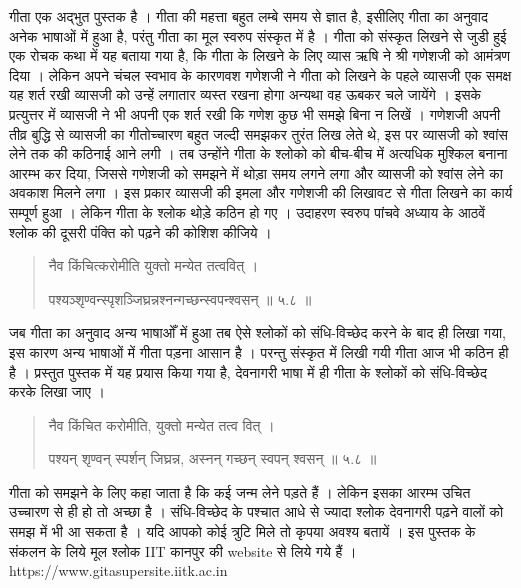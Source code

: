 गीता एक अद्भुत पुस्तक है ।  गीता की महत्ता बहुत लम्बे समय से ज्ञात है, इसीलिए गीता का अनुवाद अनेक भाषाओं में हुआ है, परंतु गीता का मूल स्वरुप संस्कृत में है ।  गीता को संस्कृत लिखने से जुडी हुई एक रोचक कथा में यह बताया गया है, कि गीता के लिखने के लिए व्यास ऋषि ने श्री गणेशजी को आमंत्रण दिया ।  लेकिन अपने चंचल स्वभाव के कारणवश गणेशजी ने गीता को लिखने के पहले व्यासजी एक समक्ष यह शर्त रखी व्यासजी को उन्हें लगातार व्यस्त रखना होगा अन्यथा वह ऊबकर चले जायेंगे ।  इसके प्रत्युत्तर में व्यासजी ने भी अपनी एक शर्त रखी कि गणेश कुछ भी समझे बिना न लिखें ।  गणेशजी अपनी तीव्र बुद्धि से व्यासजी का गीतोच्चारण बहुत जल्दी समझकर तुरंत लिख लेते थे, इस पर व्यासजी को श्वांस लेने तक की कठिनाई आने लगी ।  तब  उन्होंने गीता के श्लोको को बीच-बीच में अत्यधिक मुश्किल बनाना आरम्भ कर दिया, जिससे गणेशजी को समझने में थोड़ा समय लगने लगा और व्यासजी को श्वांस लेने का अवकाश मिलने लगा ।  इस प्रकार व्यासजी की इमला और गणेशजी की लिखावट से गीता लिखने का कार्य सम्पूर्ण हुआ ।  लेकिन गीता के श्लोक थोड़े कठिन हो गए ।  उदाहरण स्वरुप पांचवे अध्याय के आठवें श्लोक की दूसरी पंक्ति को पढ़ने की कोशिश कीजिये । 

\begin{quotation}\sanskrit
नैव किंचित्करोमीति युक्तो मन्येत तत्ववित्‌  । 

पश्यञ्शृण्वन्स्पृशञ्जिघ्रन्नश्नन्गच्छन्स्वपन्श्वसन्‌  ॥ ५.८ ॥  
\end{quotation}
जब गीता का अनुवाद अन्य भाषाओँ में हुआ तब ऐसे श्लोकों को संधि-विच्छेद करने के बाद ही लिखा गया, इस कारण अन्य भाषाओं में गीता पड़ना आसान है ।  परन्तु संस्कृत में लिखी गयी गीता आज भी कठिन ही है ।  प्रस्तुत पुस्तक में यह प्रयास किया गया है, देवनागरी भाषा में ही गीता के श्लोकों को संधि-विच्छेद करके लिखा जाए । 

\begin{quotation}\sanskrit
नैव किंचित करोमीति, युक्तो मन्येत तत्व वित्‌  । 

पश्यन् शृण्वन् स्पर्शन् जिघ्रन्न, अस्नन् गच्छन् स्वपन् श्वसन्‌  ॥ ५.८ ॥ 
\end{quotation}
गीता को समझने के लिए कहा जाता है कि कई जन्म लेने पड़ते हैं ।  लेकिन इसका आरम्भ उचित उच्चारण से ही हो तो अच्छा है ।  संधि-विच्छेद के पश्चात आधे से ज्यादा श्लोक देवनागरी पढ़ने वालों को समझ में भी आ सकता है ।  यदि आपको कोई त्रुटि मिले तो कृपया अवश्य बतायें । 
इस पुस्तक के संकलन के लिये मूल श्लोक \textrm{IIT} कानपुर की \textrm{website} से लिये गये हैं ।  \textrm{https://www.gitasupersite.iitk.ac.in}


